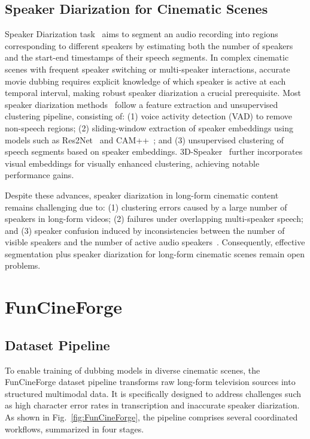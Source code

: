 \documentclass{article}
\begin{document}
\subsection{Speaker Diarization for Cinematic Scenes}
Speaker Diarization task~\cite{SD} aims to segment an audio recording into regions corresponding to different speakers
by estimating both the number of speakers and the start-end timestamps of their speech segments.
In complex cinematic scenes with frequent speaker switching or multi-speaker interactions, 
accurate movie dubbing requires explicit knowledge of which speaker is active at each temporal interval, 
making robust speaker diarization a crucial prerequisite.
Most speaker diarization methods~\cite{SD-2,SD-3} follow a feature extraction and unsupervised clustering pipeline,
consisting of: (1) voice activity detection (VAD) to remove non-speech regions; 
(2) sliding-window extraction of speaker embeddings using models such as Res2Net~\cite{Res2Net} and CAM++~\cite{CAM++}; 
and (3) unsupervised clustering of speech segments based on speaker embeddings.
3D-Speaker~\cite{3D-Speaker} further incorporates visual embeddings for visually enhanced clustering,
achieving notable performance gains.

Despite these advances, speaker diarization in long-form cinematic content remains challenging due to:
(1) clustering errors caused by a large number of speakers in long-form videos; 
(2) failures under overlapping multi-speaker speech; and 
(3) speaker confusion induced by inconsistencies between the number of visible speakers and the number of active audio speakers~\cite{SpeakerLM}. 
Consequently, effective segmentation plus speaker diarization for long-form cinematic scenes remain open problems.


\section{FunCineForge}
\subsection{Dataset Pipeline}
To enable training of dubbing models in diverse cinematic scenes, the FunCineForge dataset pipeline transforms raw long-form television sources into structured multimodal data. 
It is specifically designed to address challenges such as high character error rates in transcription and inaccurate speaker diarization.
As shown in Fig.~\ref{fig:FunCineForge}, the pipeline comprises several coordinated workflows, summarized in four stages.
\end{document}
